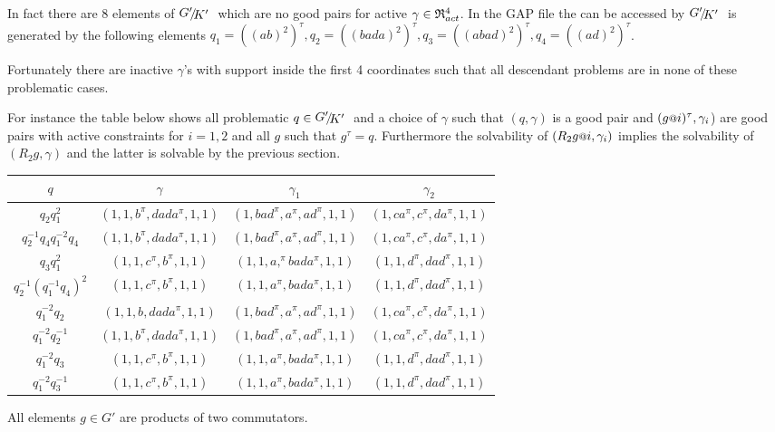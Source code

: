 \documentclass[a4paper,12pt]{article}
\begin{document}
In fact there are $8$ elements of $\RNK{G'}{K'}$ which are no good pairs for active $\gamma\in\mathfrak{R}_{act}^4$.
In the GAP file the can be accessed by  
$\RNK{G'}{K'}$ is generated by the following elements $q_1 = ((ab)^2)^\tau,q_2 = ((bada)^2)^\tau,q_3 = ((abad)^2)^\tau,q_4 = ((ad)^2)^\tau$. 

Fortunately there are inactive $\gamma$'s with support inside the first 4 coordinates such that 
all descendant problems are in none of these problematic cases. 

For instance the table below shows 
all problematic $q\in \RNK{G'}{K'}$ and a choice of $\gamma$ such that $(q,\gamma)$ is a good pair
and $(g\at{i})^\tau,\gamma_i$) are good pairs with active constraints for $i=1,2$ and all $g$ such that $g^\tau = q$. 
Furthermore the solvability of $(R_2g\at{i},\gamma_i)$ implies the solvability of $(R_2g,\gamma)$ and the latter is solvable by 
the previous section.

\begin{tabular}{cccc}
$q$ & $\gamma$ & $\gamma_1$ & $\gamma_2$\\ \hline
$q_2q_1^2 $& $ ( 1, 1, b^\pi, dada^\pi, 1, 1 ) $ & $ ( 1, bad^\pi, a^\pi, ad^\pi, 1,  1 ) $ & $ ( 1, ca^\pi, c^\pi, da^\pi, 1, 1 )$\\
$q_2^{-1}q_4q_1^{-2}q_4$& $ ( 1, 1, b^\pi, dada^\pi, 1, 1 ) $ & $ ( 1, bad^\pi, a^\pi, ad^\pi, 1,  1 ) $ & $ ( 1, ca^\pi, c^\pi, da^\pi, 1, 1 )$\\
$q_3q_1^2 $			& $ ( 1, 1, c^\pi, b^\pi, 1, 1 ) $ & $ ( 1, 1, a,^\pi bada^\pi, 1, 1 ) $ & $ ( 1, 1, d^\pi, dad^\pi, 1, 1 )$\\
$q_2^{-1}(q_1^{-1}q_4)^2$ 	 & $ ( 1, 1, c^\pi, b^\pi, 1, 1 ) $ & $ ( 1, 1, a^\pi, bada^\pi, 1,   1 ) $ & $ ( 1, 1, d^\pi, dad^\pi, 1, 1 )$\\
$q_1^{-2}q_2$		 & $ ( 1, 1, b, dada^\pi, 1, 1 ) $ & $ ( 1, bad^\pi, a^\pi, ad^\pi, 1,  1 ) $ & $ ( 1, ca^\pi, c^\pi, da^\pi, 1, 1 )$\\
$q_1^{-2}q_2^{-1}$		 & $ ( 1, 1, b^\pi, dada^\pi, 1, 1 ) $ & $ ( 1, bad^\pi, a^\pi, ad^\pi, 1,  1 ) $ & $ ( 1, ca^\pi, c^\pi, da^\pi, 1, 1 )$\\
$q_1^{-2}q_3$		 & $ ( 1, 1, c^\pi, b^\pi, 1, 1 ) $ & $ ( 1, 1, a^\pi, bada^\pi, 1,  1 ) $ & $ ( 1, 1, d^\pi, dad^\pi, 1, 1 )$\\
$q_1^{-2}q_3^{-1}$		 & $ ( 1, 1, c^\pi, b^\pi, 1, 1 ) $ & $ ( 1, 1, a^\pi, bada^\pi, 1,  1 ) $ & $ ( 1, 1, d^\pi, dad^\pi, 1, 1 )$
\end{tabular}
\begin{cor}
 All elements $g\in G'$ are products of two commutators.
\end{cor}
\end{document}
